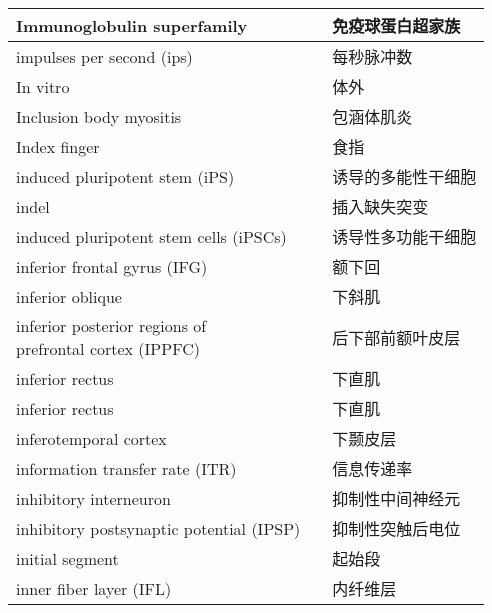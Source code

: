 \begin{longtable}{lll}
	\midrule
	Immunoglobulin superfamily   && 免疫球蛋白超家族  \\
	
	\midrule
	impulses per second (ips)   && 每秒脉冲数  \\
	
	\midrule
	In vitro   && 体外  \\
	
	\midrule
	Inclusion body myositis  && 包涵体肌炎  \\
	
	\midrule
	Index finger  && 食指  \\
	
	\midrule
	induced pluripotent stem (iPS)  && 诱导的多能性干细胞  \\
	
	\midrule
	indel   && 插入缺失突变  \\
	
	\midrule
	induced pluripotent stem cells (iPSCs)  && 诱导性多功能干细胞  \\
	
	\midrule
	inferior frontal gyrus (IFG)   && 额下回  \\
	
	\midrule
	inferior oblique   && 下斜肌  \\
	
	\midrule
	\makecell[l]{inferior posterior regions of \\ prefrontal cortex (IPPFC)}  && 后下部前额叶皮层  \\
	
	\midrule
	inferior rectus   && 下直肌  \\
	
	\midrule
	inferior rectus   && 下直肌  \\
	
	\midrule
	inferotemporal cortex   && 下颞皮层  \\
	
	\midrule
	information transfer rate (ITR)   && 信息传递率  \\
	
	\midrule
	inhibitory interneuron  && 抑制性中间神经元  \\
	
	\midrule
	inhibitory postsynaptic potential (IPSP)  && 抑制性突触后电位  \\
	
	\midrule
	initial segment && 起始段  \\
	
	\midrule
	inner fiber layer (IFL)   && 内纤维层  \\
	

\end{longtable}
